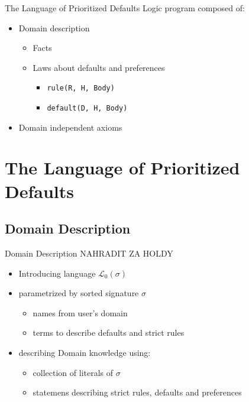 \documentclass{beamer}
\begin{document}
  \begin{frame}{The Language of Prioritized Defaults}
    Logic program composed of: %
    \begin{itemize}
      \item Domain description %
      \begin{itemize}
        \item Facts 
        \item Laws about defaults and preferences
        \begin{itemize}
          \item \texttt{rule(R, H, Body)} 
          \item \texttt{default(D, H, Body)}
        \end{itemize}
      \end{itemize}
      \item Domain independent axioms %
    \end{itemize}
  \end{frame}

\section{The Language of Prioritized Defaults}

  \subsection{Domain Description}


  \begin{frame}{Domain Description}
    NAHRADIT ZA HOLDY
    \begin{itemize}
      \item Introducing language $\mathcal{L}_0(\sigma)$
      \item parametrized by sorted signature $\sigma$
      \begin{itemize}
        \item names from user's domain
        \item terms to describe defaults and strict rules
      \end{itemize}
      \item describing Domain knowledge using: 
      \begin{itemize}
        \item collection of literals of $\sigma$
        \item statemens describing strict rules, defaults and preferences
      \end{itemize}
    \end{itemize}
  \end{frame}
\end{document}
